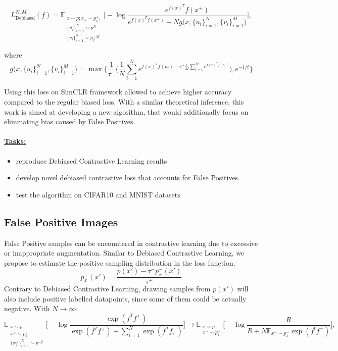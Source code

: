 \documentclass{article}
\begin{document}
\begin{equation}
L_{\text{Debiased}}^{N, M} (f) = \mathbb{E}_{\substack{x \sim p; x_+ \sim p_x^+,\\ \{u_i\}_{i=1}^N \sim p^N \\ \{v_i\}_{i=1}^N \sim p_x^+^M}}  \bigg[ -\log \frac{e^{f(x)^T} f(x^+)}{e^{f(x)^T f(x^+)} + N g\big(x, \{u_i\}_{i=1}^N, \{v_i\}_{i=1}^M\big)} \bigg],
\end{equation}

where
\begin{equation}
g\big(x, \{u_i\}_{i=1}^N, \{v_i\}_{i=1}^M\big) = \max \bigg\{ \frac{1}{\tau^-}\bigg(\frac{1}{N} \sum \limits_{i=1}^N e^{f(x)^T f(u_i) - \tau^+ \frac{1}{M} \sum \limits_{i=1}^M e^{f(x)^T f(v_i)}}\bigg), e^{-1/t}\bigg\}
\end{equation}

Using this loss on SimCLR framework allowed to achieve higher accuracy compared to the regular biased loss. With a similar theoretical inference, this work is aimed at developing a new algorithm, that would additionally focus on eliminating bias caused by False Positives.

\paragraph{\underline{Tasks:}} 
\begin{itemize}
  \item reproduce Debiased Contrastive Learning results
  \item develop novel debiased contrastive loss that accounts for False Positives.
  \item test the algorithm on CIFAR10 and MNIST datasets
\end{itemize}


\subsection{False Positive Images}
False Positive samples can be encountered in contrastive learning due to excessive or inappropriate augmentation. Similar to Debiased Contrastive Learning, we propose to estimate the positive sampling distribution in the loss function.
\begin{equation}
p_x^+ (x') = \frac{p(x') - \tau^- p^-_x(x')}{\tau^+}
\end{equation}
Contrary to Debiased Contrastive Learning, drawing samples from $p(x')$ will also include positive labelled datapoints, since some of them could be actually negative. With $N \to \infty$:
\begin{equation}
\mathbb{E}_{\substack{x \sim p \\ x^+ \sim p_x^+ \\ \{x_i^-\}_{i=1}^N \sim p^-^N_x}} \bigg[ - \log \frac{\exp(f^T f^+)}{\exp(f^T f^+) + \sum_{i=1}^N \exp(f^T f_i^-)} \bigg] \longrightarrow \mathbb{E}_{\substack{x \sim p \\ x^- \sim p_x^-}} \bigg[ - \log \frac{R}{R + N \mathbb{E}_{x^- \sim p_x^-} \exp(f^t f^-)} \bigg],
\end{equation}
\end{document}
